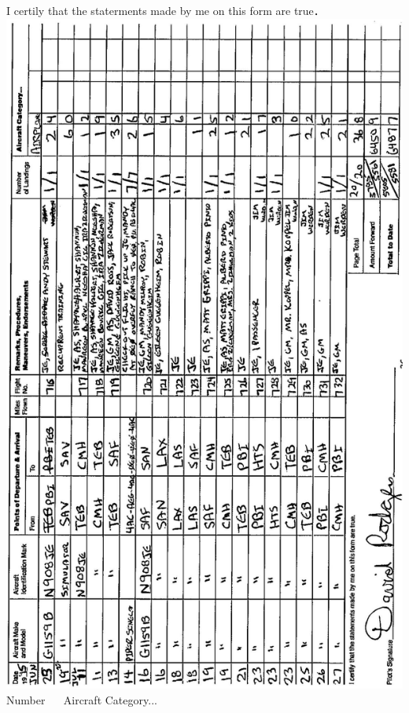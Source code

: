 \documentclass[10pt]{article}
\begin{document}
I certily that the staterments made by me on this form are true．\\
\includegraphics[max width=\textwidth, center]{2025_02_27_dd68c3d38de88f0516d9g-040}\\
Number \(\quad\) Aircraft Category...\\
\end{document}

